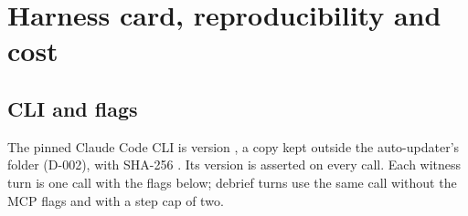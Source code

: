 \section{Harness card, reproducibility and cost}\label{app:harness}

\subsection{CLI and flags}
The pinned Claude Code CLI is version \wtthDesignCliVersion, a copy kept outside the auto-updater's folder (\mbox{D-002}), with SHA-256 {\footnotesize\texttt{\wtthDesignBinarySha}}.
Its version is asserted on every call.
Each witness turn is one call with the flags below; debrief turns use the same call without the MCP flags and with a step cap of two.
